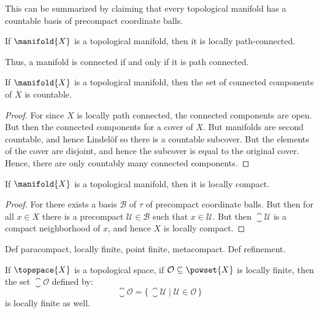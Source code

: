 \documentclass{article}                                                        %
\begin{document}
            This can be summarized by claiming that every topological manifold
            has a countable basis of precompact coordinate balls.
            \begin{theorem}
                If $\manifold{X}$ is a topological manifold, then it is
                locally path-connected.
            \end{theorem}
            Thus, a manifold is connected if and only if it is path connected.
            \begin{theorem}
                If $\manifold{X}$ is a topological manifold, then the set of
                connected components of $X$ is countable.
            \end{theorem}
            \begin{proof}
                For since $X$ is locally path connected, the connected
                components are open. But then the connected components for a
                cover of $X$. But manifolds are second countable, and hence
                Lindel\"{o}f so there is a countable subcover. But the elements
                of the cover are disjoint, and hence the subcover is equal to
                the original cover. Hence, there are only countably many
                connected components.
            \end{proof}
            \begin{theorem}
                If $\manifold{X}$ is a topological manifold, then it is locally
                compact.
            \end{theorem}
            \begin{proof}
                For there exists a basis $\mathcal{B}$ of $\tau$ of precompact
                coordinate balls. But then for all $x\in{X}$ there is a
                precompact $\mathcal{U}\in\mathcal{B}$ such that
                $x\in\mathcal{U}$. But then $\closure{\mathcal{U}}$ is a compact
                neighborhood of $x$, and hence $X$ is locally compact.
            \end{proof}
            Def paracompact, locally finite, point finite, metacompact.
            Def refinement.
            \begin{theorem}
                If $\topspace{X}$ is a topological space, if
                $\mathcal{O}\subseteq\powset{X}$ is locally finite, then the
                set $\closure{\mathcal{O}}$ defined by:
                \begin{equation}
                    \closure{\mathcal{O}}=
                        \{\,\closure{\mathcal{U}}\;|\;
                        \mathcal{U}\in\mathcal{O}\,\}
                \end{equation}
                is locally finite as well.
            \end{theorem}
\end{document}
